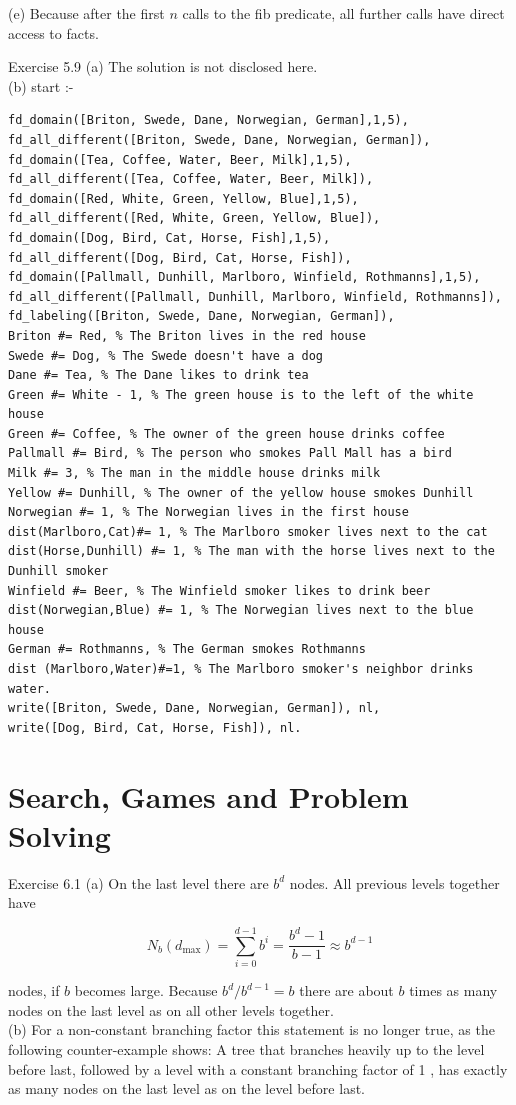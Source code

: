 \documentclass[10pt]{book}
\begin{document}
(e) Because after the first $n$ calls to the fib predicate, all further calls have direct access to facts.

Exercise 5.9
(a) The solution is not disclosed here.\\
(b) start :-

\begin{verbatim}
fd_domain([Briton, Swede, Dane, Norwegian, German],1,5),
fd_all_different([Briton, Swede, Dane, Norwegian, German]),
fd_domain([Tea, Coffee, Water, Beer, Milk],1,5),
fd_all_different([Tea, Coffee, Water, Beer, Milk]),
fd_domain([Red, White, Green, Yellow, Blue],1,5),
fd_all_different([Red, White, Green, Yellow, Blue]),
fd_domain([Dog, Bird, Cat, Horse, Fish],1,5),
fd_all_different([Dog, Bird, Cat, Horse, Fish]),
fd_domain([Pallmall, Dunhill, Marlboro, Winfield, Rothmanns],1,5),
fd_all_different([Pallmall, Dunhill, Marlboro, Winfield, Rothmanns]),
fd_labeling([Briton, Swede, Dane, Norwegian, German]),
Briton #= Red, % The Briton lives in the red house
Swede #= Dog, % The Swede doesn't have a dog
Dane #= Tea, % The Dane likes to drink tea
Green #= White - 1, % The green house is to the left of the white house
Green #= Coffee, % The owner of the green house drinks coffee
Pallmall #= Bird, % The person who smokes Pall Mall has a bird
Milk #= 3, % The man in the middle house drinks milk
Yellow #= Dunhill, % The owner of the yellow house smokes Dunhill
Norwegian #= 1, % The Norwegian lives in the first house
dist(Marlboro,Cat)#= 1, % The Marlboro smoker lives next to the cat
dist(Horse,Dunhill) #= 1, % The man with the horse lives next to the Dunhill smoker
Winfield #= Beer, % The Winfield smoker likes to drink beer
dist(Norwegian,Blue) #= 1, % The Norwegian lives next to the blue house
German #= Rothmanns, % The German smokes Rothmanns
dist (Marlboro,Water)#=1, % The Marlboro smoker's neighbor drinks water.
write([Briton, Swede, Dane, Norwegian, German]), nl,
write([Dog, Bird, Cat, Horse, Fish]), nl.
\end{verbatim}

\section{Search, Games and Problem Solving}
Exercise 6.1
(a) On the last level there are $b^{d}$ nodes. All previous levels together have

$$
N_{b}\left(d_{\max }\right)=\sum_{i=0}^{d-1} b^{i}=\frac{b^{d}-1}{b-1} \approx b^{d-1}
$$

nodes, if $b$ becomes large. Because $b^{d} / b^{d-1}=b$ there are about $b$ times as many nodes on the last level as on all other levels together.\\
(b) For a non-constant branching factor this statement is no longer true, as the following counter-example shows: A tree that branches heavily up to the level before last, followed by a level with a constant branching factor of 1 , has exactly as many nodes on the last level as on the level before last.
\end{document}
